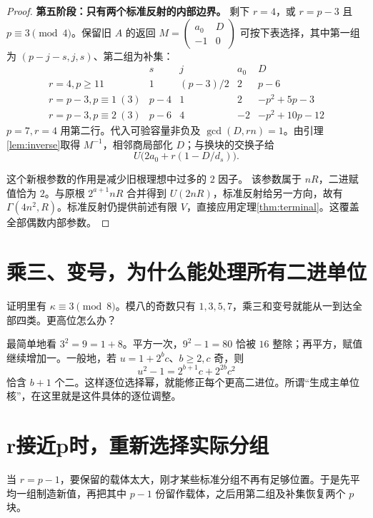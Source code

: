 \begin{proof}
\par\noindent\textbf{第五阶段：只有两个标准反射的内部边界。}
剩下 $r=4$，或 $r=p-3$ 且 $p\equiv3\pmod4$。保留旧 $A$ 的返回 $M=\left(\begin{smallmatrix}a_0&D\\-1&0\end{smallmatrix}\right)$ 可按下表选择，其中第一组为 $(p-j-s,j,s)$、第二组为补集：
\[
\begin{array}{c|rrrr}
&s&j&a_0&D\\\hline
r=4,p\ge11&1&(p-3)/2&2&p-6\\
r=p-3,p\equiv1\ (3)&p-4&1&2&-p^2+5p-3\\
r=p-3,p\equiv2\ (3)&p-6&4&-2&-p^2+10p-12
\end{array}
\]
$p=7,r=4$ 用第二行。代入可验容量非负及 $\gcd(D,rn)=1$。由引理\ref{lem:inverse}取得 $M^{-1}$，相邻商局部化 $D$；与换块的交换子给
\[U\bigl(2a_0+r(1-D/d_s)\bigr).
\]

这个新根参数的作用是减少旧根理想中过多的 $2$ 因子。
该参数属于 $nR$，二进赋值恰为 $2$。与原根 $2^{a+1}nR$ 合并得到 $U(2nR)$，标准反射给另一方向，故有 $\Gamma(4n^2,R)$。标准反射仍提供前述有限 $V$，直接应用定理\ref{thm:terminal}。这覆盖全部偶数内部参数。
\end{proof}

\section{乘三、变号，为什么能处理所有二进单位}
证明里有 $\kappa\equiv3\pmod8$。模八的奇数只有 $1,3,5,7$，乘三和变号就能从一到达全部四类。更高位怎么办？

最简单地看 $3^2=9=1+8$。平方一次，$9^2-1=80$ 恰被 $16$ 整除；再平方，赋值继续增加一。一般地，若 $u=1+2^bc$、$b\ge2,c$ 奇，则
\[u^2-1=2^{b+1}c+2^{2b}c^2
\]
恰含 $b+1$ 个二。这样逐位选择幂，就能修正每个更高二进位。所谓“生成主单位核”，在这里就是这件具体的逐位调整。

\section{r接近p时，重新选择实际分组}
当 $r=p-1$，要保留的载体太大，刚才某些标准分组不再有足够位置。于是先平均一组制造新值，再把其中 $p-1$ 份留作载体，之后用第二组及补集恢复两个 $p$ 块。

